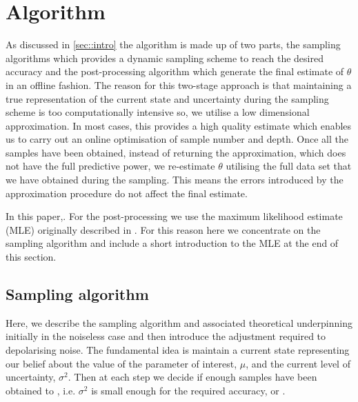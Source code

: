 
\section{Algorithm}
As discussed in \ref{sec::intro} the algorithm is made up of two parts, the sampling algorithms which provides a dynamic sampling scheme to reach the desired accuracy and the post-processing algorithm which generate the final estimate of $\theta$ in an offline fashion. The reason for this two-stage approach is that maintaining a true representation of the current state and uncertainty during the sampling scheme is too computationally intensive so, we utilise a low dimensional approximation. In most cases, this provides a high quality estimate which enables us to carry out an online optimisation of sample number and depth. Once all the samples have been obtained, instead of returning the approximation, which does not have the full predictive power, we re-estimate $\theta$ utilising the full data set that we have obtained during the sampling. This means the errors introduced by the approximation procedure do not affect the final estimate.

In this paper,. For the post-processing we use the maximum likelihood estimate (MLE) originally described in \cite{MLE}. For this reason here we concentrate on the sampling algorithm and include a short introduction to the MLE at the end of this section.

\subsection{Sampling algorithm}
Here, we describe the sampling algorithm and associated theoretical underpinning initially in the noiseless case and then introduce the adjustment required to  depolarising noise. The fundamental idea is  maintain a current state representing our belief about the value of the parameter of interest, $\mu$, and the current level of uncertainty, $\sigma^2$. Then at each step we decide if enough samples have been obtained to , i.e. $\sigma^2$ is small enough for the required accuracy, or .

